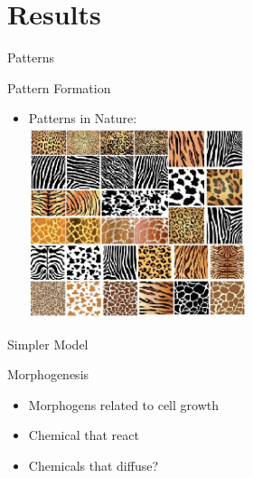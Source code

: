 \documentclass[t,10pt,fleqn]{beamer}
\begin{document}
\section{Results}
\begin{frame}{Patterns}
\vspace{-.3cm}
\begin{block}{Pattern Formation}
  \begin{itemize}
    \pause
    \item Patterns in Nature:
    \pause
    \\
    \includegraphics[width=0.5\textwidth]{creature_patterns2.png}
  \end{itemize}
\end{block}
\pause
\end{frame}

\begin{frame}{Simpler Model}
  \vspace{-.3cm}
  \begin{block}{Morphogenesis}
    \begin{itemize}
      \pause
      \item Morphogens related to cell growth
      \pause
      \item Chemical that react
      \pause
      \item Chemicals that diffuse?
      \pause
    \end{itemize}
  \end{block}
  \pause
  \end{frame}
\end{document}
